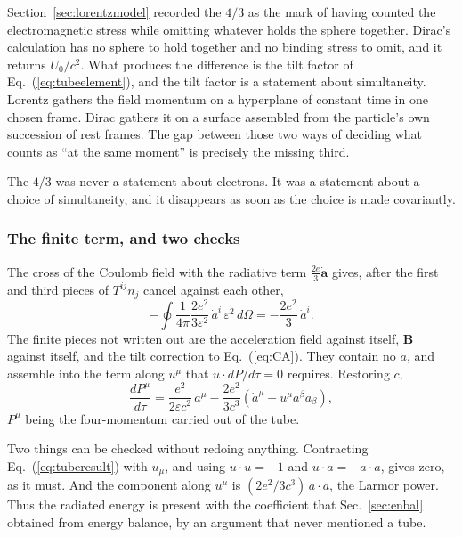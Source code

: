 \documentclass[preprint]{aastex701}
\begin{document}
Section~\ref{sec:lorentzmodel} recorded the $4/3$ as the mark of having counted
the electromagnetic stress while omitting whatever holds the sphere together.
Dirac's calculation has no sphere to hold together and no binding stress to
omit, and it returns $U_0/c^2$. What produces the difference is the tilt factor
of Eq.~(\ref{eq:tubeelement}), and the tilt factor is a statement about
simultaneity. Lorentz gathers the field momentum on a hyperplane of constant
time in one chosen frame. Dirac gathers it on a surface assembled from the
particle's own succession of rest frames. The gap between those two ways of
deciding what counts as ``at the same moment'' is precisely the missing third.

The $4/3$ was never a statement about electrons. It was a statement about a
choice of simultaneity, and it disappears as soon as the choice is made
covariantly.

\subsubsection{The finite term, and two checks}
\label{sec:finiteterm}

The cross of the Coulomb field with the radiative term
$\tfrac{2e}{3}\dot{\mathbf a}$ gives, after the first and third pieces of
$T^{ij}n_j$ cancel against each other,
\begin{equation}
-\oint\frac{1}{4\pi}\frac{2e^2}{3\varepsilon^2}\,\dot a^i\,
\varepsilon^2\,d\Omega = -\frac{2e^2}{3}\,\dot a^i .
\label{eq:finiteterm}
\end{equation}
The finite pieces not written out are the acceleration field against itself,
$\mathbf B$ against itself, and the tilt correction to Eq.~(\ref{eq:CA}). They
contain no $\dot a$, and assemble into the term along $u^\mu$ that
$u\cdot dP/d\tau = 0$ requires. Restoring $c$,
\begin{equation}
\frac{dP^\mu}{d\tau}
= \frac{e^2}{2\varepsilon c^2}\,a^\mu
- \frac{2e^2}{3c^3}\left(\dot a^\mu - u^\mu a^\beta a_\beta\right),
\label{eq:tuberesult}
\end{equation}
$P^\mu$ being the four-momentum carried out of the tube.

Two things can be checked without redoing anything. Contracting
Eq.~(\ref{eq:tuberesult}) with $u_\mu$, and using $u\cdot u=-1$ and
$u\cdot\dot a = -a\cdot a$, gives zero, as it must. And the component along
$u^\mu$ is $(2e^2/3c^3)\,a\cdot a$, the Larmor power. Thus the radiated energy
is present with the coefficient that Sec.~\ref{sec:enbal} obtained from energy
balance, by an argument that never mentioned a tube.
\end{document}
